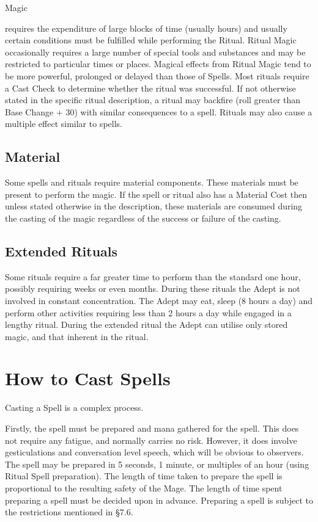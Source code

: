 \begin{Chapter}{Magic}
\begin{Description}
\item[Ritual Magic] requires the expenditure of large blocks of time
  (usually hours) and usually certain conditions must be fulfilled
  while performing the Ritual.  Ritual Magic occasionally requires a
  large number of special tools and substances and may be restricted
  to particular times or places.  Magical effects from Ritual Magic
  tend to be more powerful, prolonged or delayed than those of Spells.
  Most rituals require a Cast Check to determine whether the ritual
  was successful.  If not otherwise stated in the specific ritual
  description, a ritual may backfire (roll greater than Base Change +
  30) with similar consequences to a spell.  Rituals may also cause a
  multiple effect similar to spells.

\end{Description}

\subsection{Material}

Some spells and rituals require material components.  These materials
must be present to perform the magic.  If the spell or ritual also has
a Material Cost then unless stated otherwise in the description,
these materials are consumed during the casting of the magic
regardless of the success or failure of the casting.


\subsection{Extended Rituals}

Some rituals require a far greater time to perform than the standard
one hour, possibly requiring weeks or even months.  During these
rituals the Adept is not involved in constant concentration.  The
Adept may eat, sleep (8 hours a day) and perform other activities
requiring less than 2 hours a day while engaged in a lengthy ritual.
During the extended ritual the Adept can utilise only stored magic,
and that inherent in the ritual.

\section{How to Cast Spells}

Casting a Spell is a complex process. 

\begin{Description}
  \item[Preparing] Firstly, the spell must be prepared and mana
    gathered for the spell.  This does not require any fatigue, and
    normally carries no risk. However, it does involve gesticulations
    and conversation level speech, which will be obvious to observers.
    The spell may be prepared in 5 seconds, 1 minute, or multiples of
    an hour (using Ritual Spell preparation). The length of time taken
    to prepare the spell is proportional to the resulting safety of
    the Mage.  The length of time spent preparing a spell must be
    decided upon in advance.  Preparing a spell is subject to the
    restrictions mentioned in §7.6.


\end{Description}
\end{Chapter}
